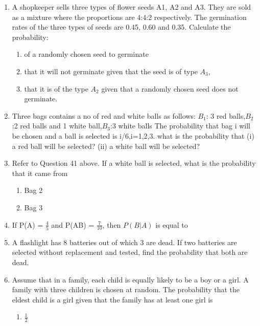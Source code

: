 \begin{enumerate}[label=\thesubsection.\arabic*,ref=\thesubsection.\theenumi]
\\
%
\item A shopkeeper sells three types of flower seeds A1, A2 and A3. They are sold as a mixture where the proportions are 4:4:2 respectively. The germination rates of the three types of seeds are 0.45, 0.60 and 0.35. Calculate the probability:
\begin{enumerate}
\item of a randomly chosen seed to germinate
\item that it will not germinate given that the seed is of type $A_3$,
\item that it is of the type $A_2$ given that a randomly chosen seed does not germinate.
\end{enumerate}
%
\item Three bags contains a no of red and white balls as follows:
$B_1$: 3 red balls,$B_2$:2 red balls and 1 white ball,$B_3$:3 white balls
The probability that bag i will be chosen and a ball is selected is i/6,i=1,2,3.
what is the probability that
(i) a red ball will be selected?     
(ii) a white ball will be selected?\\
\solution
%
\item Refer to Question 41 above. If a white ball is selected, what is the probability that it came from\\
\begin{enumerate}
\item  Bag 2
\item  Bag 3
\end{enumerate}
\solution
%
\item If P(A) = $\frac{4}{5}$ and P(AB) = $\frac{7}{10}$, then $P(B|A)$ is equal to\\
\solution
%
\item A flashlight has 8 batteries out of which 3 are dead. If two batteries are selected without replacement and tested, find the probability that both are dead.\\
%
\item Assume that in a family, each child is equally likely to be a boy or a girl. A family with three children is chosen at random. The probability that the eldest child is a girl given that the family has at least one girl is
\begin{enumerate}
\item $\frac{1}{2}$

\end{enumerate}
\end{enumerate}

